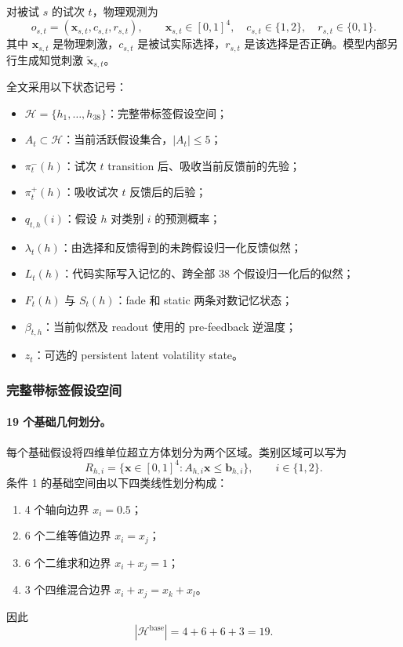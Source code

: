 对被试 $s$ 的试次 $t$，物理观测为
\begin{equation}
    o_{s,t}
    =
    (\mathbf x_{s,t},c_{s,t},r_{s,t}),
    \qquad
    \mathbf x_{s,t}\in[0,1]^4,\quad
    c_{s,t}\in\{1,2\},\quad
    r_{s,t}\in\{0,1\}.
    \label{eq:modelv14-observation}
\end{equation}
其中 $\mathbf x_{s,t}$ 是物理刺激，$c_{s,t}$ 是被试实际选择，$r_{s,t}$ 是该选择是否正确。模型内部另行生成知觉刺激 $\widetilde{\mathbf x}_{s,t}$。

全文采用以下状态记号：
\begin{itemize}
    \item $\mathcal H=\{h_1,\ldots,h_{38}\}$：完整带标签假设空间；
    \item $A_t\subset\mathcal H$：当前活跃假设集合，$|A_t|\leq5$；
    \item $\pi_t^-(h)$：试次 $t$ transition 后、吸收当前反馈前的先验；
    \item $\pi_t^+(h)$：吸收试次 $t$ 反馈后的后验；
    \item $q_{t,h}(i)$：假设 $h$ 对类别 $i$ 的预测概率；
    \item $\lambda_t(h)$：由选择和反馈得到的未跨假设归一化反馈似然；
    \item $L_t(h)$：代码实际写入记忆的、跨全部 38 个假设归一化后的似然；
    \item $F_t(h)$ 与 $S_t(h)$：fade 和 static 两条对数记忆状态；
    \item $\beta_{t,h}$：当前似然及 readout 使用的 pre-feedback 逆温度；
    \item $z_t$：可选的 persistent latent volatility state。
\end{itemize}


\subsubsection{完整带标签假设空间}

\paragraph{19 个基础几何划分。}
每个基础假设将四维单位超立方体划分为两个区域。类别区域可以写为
\begin{equation}
    R_{h,i}
    =
    \{\mathbf x\in[0,1]^4:
      A_{h,i}\mathbf x\leq\mathbf b_{h,i}\},
    \qquad i\in\{1,2\}.
    \label{eq:modelv14-region}
\end{equation}
条件 1 的基础空间由以下四类线性划分构成：
\begin{enumerate}
    \item 4 个轴向边界 $x_i=0.5$；
    \item 6 个二维等值边界 $x_i=x_j$；
    \item 6 个二维求和边界 $x_i+x_j=1$；
    \item 3 个四维混合边界 $x_i+x_j=x_k+x_l$。
\end{enumerate}
因此
\begin{equation}
    |\mathcal H^{\mathrm{base}}|
    =
    4+6+6+3
    =
    19.
    \label{eq:modelv14-base-space}
\end{equation}

